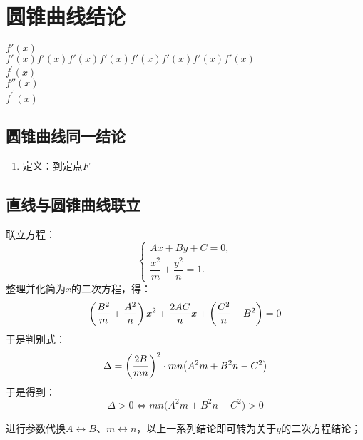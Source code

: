 \section{圆锥曲线结论}
$f'(x)$\\
$f'(x)f'(x)f'(x)f'(x)f'(x)f'(x)f'(x)f'(x)$\\
$f^{'}(x)$\\
$f''(x)$\\
$f^\prime^\prime(x)$\\
\subsection{圆锥曲线同一结论}
    \begin{enumerate}
        \item 定义：到定点$F$
    \end{enumerate}

\subsection{直线与圆锥曲线联立}
联立方程：
    \begin{equation}
        \left\{\begin{aligned}
            Ax+By+C=0,\\
            \dfrac{x^2}{m}+\dfrac{y^2}{n}=1.
        \end{aligned}\right.
    \end{equation}\label{eq:eqs}
整理并化简为$x$的二次方程，得：
    \begin{equation}
        \left(\frac{B^2}{m}+\frac{A^2}{n}\right)x^2+\frac{2AC}{n}x+\left(\frac{C^2}{n}-B^2\right)=0
    \end{equation}\label{eq:eq0}
于是判别式：
    \begin{equation}
        \Delta=\left(\frac{2B}{mn}\right)^2\cdot mn\bigl(A^2m+B^2n-C^2\bigr)
    \end{equation}\label{eq:Delta}
于是得到：
    \begin{equation}
        \Delta>0 \Longleftrightarrow mn\bigl(A^2m+B^2n-C^2\bigr)>0
    \end{equation}\label{eq:Delta}


    进行参数代换$A\leftrightarrow B$、$m\leftrightarrow n$，以上一系列结论即可转为关于$y$的二次方程结论；


